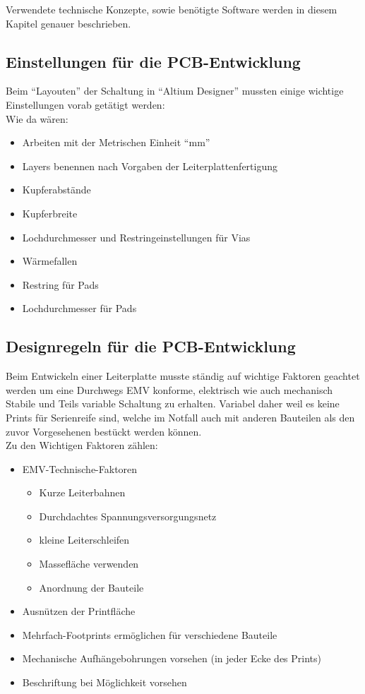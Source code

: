 
Verwendete technische Konzepte, sowie benötigte Software werden in diesem Kapitel genauer beschrieben.

\newpage
\subsection{Einstellungen für die PCB-Entwicklung}\label{subsec:3.1.1}
Beim \enquote{Layouten} der Schaltung in \enquote{Altium Designer} mussten einige wichtige Einstellungen vorab getätigt werden:\\
Wie da wären:
\begin{itemize}
	\item Arbeiten mit der Metrischen Einheit \enquote{mm}
	\item Layers benennen nach Vorgaben der Leiterplattenfertigung
	\item Kupferabstände
	\item Kupferbreite
	\item Lochdurchmesser und Restringeinstellungen für Vias
	\item Wärmefallen
	\item Restring für Pads
	\item Lochdurchmesser für Pads
\end{itemize}

\subsection{Designregeln für die PCB-Entwicklung}\label{subsec:3.1.2}
Beim Entwickeln einer Leiterplatte musste ständig auf wichtige Faktoren geachtet werden um eine Durchwegs EMV konforme, elektrisch wie auch mechanisch Stabile und Teils variable Schaltung zu erhalten.
Variabel daher weil es keine Prints für Serienreife sind, welche im Notfall auch mit anderen Bauteilen als den zuvor Vorgesehenen bestückt werden können.\\
Zu den Wichtigen Faktoren zählen:
\begin{itemize}
	\item EMV-Technische-Faktoren
	\begin{itemize}
		\item Kurze Leiterbahnen
		\item Durchdachtes Spannungsversorgungsnetz
		\item kleine Leiterschleifen
		\item Massefläche verwenden
		\item Anordnung der Bauteile
	\end{itemize}
	\item Ausnützen der Printfläche
	\item Mehrfach-Footprints ermöglichen für verschiedene Bauteile
	\item Mechanische Aufhängebohrungen vorsehen (in jeder Ecke des Prints)
	\item Beschriftung bei Möglichkeit vorsehen
\end{itemize}


